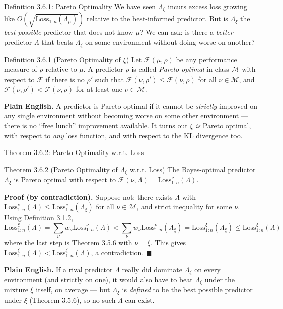 \documentclass[aspectratio=169,10pt]{beamer}
\newcommand{\Mcal}{\mathcal{M}}
\newcommand{\Loss}{\mathrm{Loss}}
\begin{document}
\begin{frame}{Definition 3.6.1: Pareto Optimality}
  We have seen $\Lambda_\xi$ incurs excess loss growing like
  $O(\sqrt{\Loss_{1:n}(\Lambda_\mu)})$ relative to the best-informed
  predictor. But is $\Lambda_\xi$ the \emph{best possible} predictor that
  does not know $\mu$? We can ask: is there a \emph{better} predictor $\Lambda$
  that beats $\Lambda_\xi$ on some environment without doing worse on
  another?
  \begin{block}{Definition 3.6.1 (Pareto Optimality of $\xi$)}
    Let $\mathcal{F}(\mu,\rho)$ be any performance measure of $\rho$ relative
    to $\mu$. A predictor $\rho$ is called \emph{Pareto optimal} in class
    $\Mcal$ with respect to $\mathcal{F}$ if there is no $\rho'$ such that
    $\mathcal{F}(\nu,\rho') \le \mathcal{F}(\nu,\rho)$ for all $\nu\in\Mcal$,
    and $\mathcal{F}(\nu,\rho') < \mathcal{F}(\nu,\rho)$ for at least one
    $\nu\in\Mcal$.
  \end{block}
  \textbf{Plain English.} A predictor is Pareto optimal if it cannot be
  \emph{strictly} improved on any single environment without becoming worse
  on some other environment --- there is no ``free lunch'' improvement
  available. It turns out $\xi$ \emph{is} Pareto optimal, with respect to
  \emph{any} loss function, and with respect to the KL divergence too.
\end{frame}

\begin{frame}{Theorem 3.6.2: Pareto Optimality w.r.t. Loss}
  \begin{block}{Theorem 3.6.2 (Pareto Optimality of $\Lambda_\xi$ w.r.t. Loss)}
    The Bayes-optimal predictor $\Lambda_\xi$ is Pareto optimal with respect
    to $\mathcal{F}(\nu,\Lambda) = \Loss_{1:n}^\nu(\Lambda)$.
  \end{block}
  \textbf{Proof (by contradiction).} Suppose not: there exists $\Lambda$ with
  $\Loss_{1:n}^\nu(\Lambda)\le\Loss_{1:n}^\nu(\Lambda_\xi)$ for all $\nu\in\Mcal$,
  and strict inequality for some $\nu$. Using Definition 3.1.2,
  \[
    \Loss_{1:n}^\xi(\Lambda) = \sum_\nu w_\nu \Loss_{1:n}^\nu(\Lambda)
    < \sum_\nu w_\nu \Loss_{1:n}^\nu(\Lambda_\xi) = \Loss_{1:n}^\xi(\Lambda_\xi)
    \le \Loss_{1:n}^\xi(\Lambda)
  \]
  where the last step is Theorem 3.5.6 with $\nu=\xi$. This gives
  $\Loss_{1:n}^\xi(\Lambda) < \Loss_{1:n}^\xi(\Lambda)$, a contradiction.
  $\blacksquare$

  \textbf{Plain English.} If a rival predictor $\Lambda$ really did dominate
  $\Lambda_\xi$ on every environment (and strictly on one), it would also
  have to beat $\Lambda_\xi$ under the mixture $\xi$ itself, on average ---
  but $\Lambda_\xi$ is \emph{defined} to be the best possible predictor under
  $\xi$ (Theorem 3.5.6), so no such $\Lambda$ can exist.
\end{frame}
\end{document}
